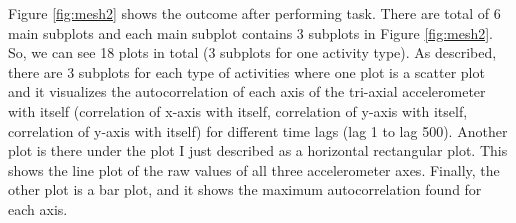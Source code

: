 \documentclass{article}
\begin{document}
Figure \ref{fig:mesh2} shows the outcome after performing task. There are total of 6 main subplots and each main subplot contains 3 subplots in Figure \ref{fig:mesh2}. So, we can see 18 plots in total (3 subplots for one activity type).
As described, there are 3 subplots for each type of activities where one plot is a scatter plot and it visualizes the autocorrelation of each axis of the tri-axial accelerometer with itself (correlation of x-axis with itself, correlation of y-axis with itself, correlation of y-axis with itself) for different time lags (lag 1 to lag 500). Another plot is there under the plot I just described as a horizontal rectangular plot. This shows the line plot of the raw values of all three accelerometer axes. Finally, the other plot is a bar plot, and it shows the maximum autocorrelation found for each axis.

\vspace{1cm}
\printbibliography
\end{document}
